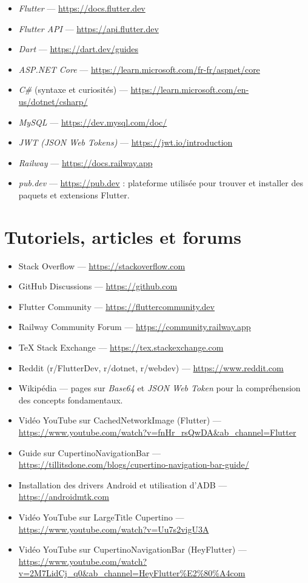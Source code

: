\documentclass[12pt]{report}
\begin{document}
\begin{itemize}
	\item \textit{Flutter} — \url{https://docs.flutter.dev}
	\item \textit{Flutter API} — \url{https://api.flutter.dev}
	\item \textit{Dart} — \url{https://dart.dev/guides}
	\item \textit{ASP.NET Core} — \url{https://learn.microsoft.com/fr-fr/aspnet/core}
	\item \textit{C\#} (syntaxe et curiosités) — \url{https://learn.microsoft.com/en-us/dotnet/csharp/}
	\item \textit{MySQL} — \url{https://dev.mysql.com/doc/}
	\item \textit{JWT (JSON Web Tokens)} — \url{https://jwt.io/introduction}
	\item \textit{Railway} — \url{https://docs.railway.app}
	\item \textit{pub.dev} — \url{https://pub.dev} : plateforme utilisée pour trouver et installer des paquets et extensions Flutter.
\end{itemize}

\section{Tutoriels, articles et forums}

\begin{itemize}
	\item Stack Overflow — \url{https://stackoverflow.com}
	\item GitHub Discussions — \url{https://github.com}
	\item Flutter Community — \url{https://fluttercommunity.dev}
	\item Railway Community Forum — \url{https://community.railway.app}
	\item TeX Stack Exchange — \url{https://tex.stackexchange.com}
	\item Reddit (r/FlutterDev, r/dotnet, r/webdev) — \url{https://www.reddit.com}
	\item Wikipédia — pages sur \textit{Base64} et \textit{JSON Web Token} pour la compréhension des concepts fondamentaux.
	\item Vidéo YouTube sur CachedNetworkImage (Flutter) — \url{https://www.youtube.com/watch?v=fnHr_rsQwDA&ab_channel=Flutter}
	\item Guide sur CupertinoNavigationBar — \url{https://tillitsdone.com/blogs/cupertino-navigation-bar-guide/}
	\item Installation des drivers Android et utilisation d’ADB — \url{https://androidmtk.com}
	\item Vidéo YouTube sur LargeTitle Cupertino — \url{https://www.youtube.com/watch?v=Uu7s2vigU3A}
	\item Vidéo YouTube sur CupertinoNavigationBar (HeyFlutter) — \url{https://www.youtube.com/watch?v=2M7LidCj_q0&ab_channel=HeyFlutter%E2%80%A4com}
\end{itemize}
\end{document}
